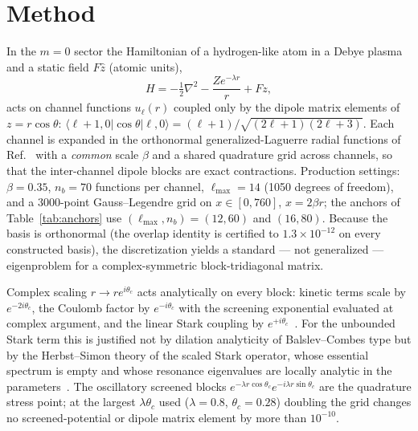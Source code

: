 \documentclass[aps,pra,twocolumn,superscriptaddress,floatfix,longbibliography]{revtex4-2}
\begin{document}
\section{Method}
\label{sec:method}

In the $m=0$ sector the Hamiltonian of a hydrogen-like atom in a
Debye plasma and a static field $F\hat z$ (atomic units),
\begin{equation}
H=-\tfrac12\nabla^{2}-\frac{Z e^{-\lambda r}}{r}+F z,
\end{equation}
acts on channel functions $u_{\ell}(r)$ coupled only by the dipole
matrix elements of $z=r\cos\theta$:
$\langle\ell+1,0|\cos\theta|\ell,0\rangle=
(\ell+1)/\sqrt{(2\ell+1)(2\ell+3)}$. Each channel is expanded in the
orthonormal generalized-Laguerre radial functions of
Ref.~\cite{companionNR} with a \emph{common} scale $\beta$ and a
shared quadrature grid across channels, so that the inter-channel
dipole blocks are exact contractions. Production settings: $\beta=
0.35$, $n_b=70$ functions per channel, $\ell_{\max}=14$ (1050 degrees
of freedom), and a 3000-point Gauss--Legendre grid on $x\in[0,760]$,
$x=2\beta r$; the anchors of Table~\ref{tab:anchors} use
$(\ell_{\max},n_b)=(12,60)$ and $(16,80)$. Because the basis is
orthonormal (the overlap identity is certified to $1.3\times10^{-12}$
on every constructed basis), the discretization yields a standard ---
not generalized --- eigenproblem for a complex-symmetric
block-tridiagonal matrix.

Complex scaling $r\to re^{i\theta_c}$ acts analytically on every
block: kinetic terms scale by $e^{-2i\theta_c}$, the Coulomb factor by
$e^{-i\theta_c}$ with the screening exponential evaluated at complex
argument, and the linear Stark coupling by
$e^{+i\theta_c}$~\cite{AguilarCombes1971,BalslevCombes1971,Ho1983,
Reinhardt1982,Moiseyev1998}. For the unbounded Stark term this is
justified not by dilation analyticity of Balslev--Combes type but by
the Herbst--Simon theory of the scaled Stark operator, whose essential
spectrum is empty and whose resonance eigenvalues are locally analytic
in the parameters~\cite{Herbst1979,HerbstSimon1978}. The oscillatory
screened blocks $e^{-\lambda r\cos\theta_c}e^{-i\lambda r
\sin\theta_c}$ are the quadrature stress point; at the largest
$\lambda\theta_c$ used ($\lambda=0.8$, $\theta_c=0.28$) doubling the
grid changes no screened-potential or dipole matrix element by more
than $10^{-10}$.
\end{document}
